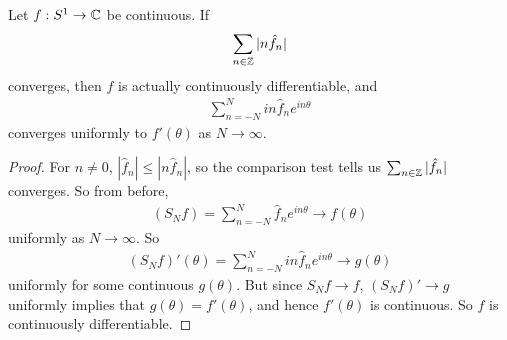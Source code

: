 \documentclass[a4paper]{article}
\begin{document}
\begin{lemma}
Let $f:S^1 \to \mathbb{C}$ be continuous. If
\begin{equation*}
\begin{aligned}
\sum_{n \in \mathbb{Z}} |n \hat{f}_n|
\end{aligned}
\end{equation*}
converges, then $f$ is actually continuously differentiable, and
\begin{equation*}
\begin{aligned}
\sum_{n=-N}^N in\hat{f}_n e^{in\theta}
\end{aligned}
\end{equation*}
converges uniformly to $f'\left(\theta\right)$ as $N \to \infty$.
\begin{proof}
For $n \neq 0$, $|\hat{f}_n| \leq |n\hat{f}_n|$, so the comparison test tells us $\sum_{n \in \mathbb{Z}} |\hat{f}_n|$ converges. So from before,
\begin{equation*}
\begin{aligned}
\left(S_N f\right) = \sum_{n=-N}^N \hat{f}_n e^{in\theta} \to f\left(\theta\right)
\end{aligned}
\end{equation*}
uniformly as $N \to \infty$. So
\begin{equation*}
\begin{aligned}
\left(S_N f\right)'\left(\theta\right) = \sum_{n=-N}^N in \hat{f}_n e^{in\theta} \to g\left(\theta\right)
\end{aligned}
\end{equation*}
uniformly for some continuous $g\left(\theta\right)$. But since $S_N f\to f$, $\left(S_N f\right)' \to g$ uniformly implies that $g\left(\theta\right) = f'\left(\theta\right)$, and hence $f'\left(\theta\right)$ is continuous. So $f$ is continuously differentiable.
\end{proof}
\end{lemma}
\end{document}
